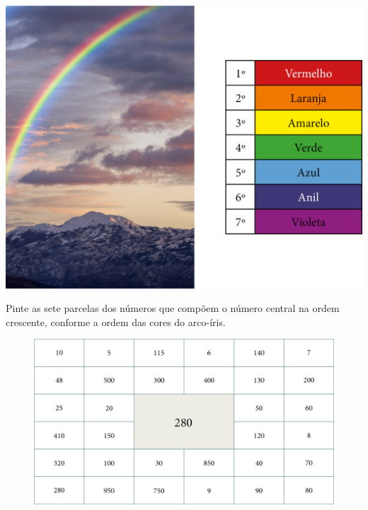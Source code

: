 \begin{minipage}{.7\textwidth}
\includegraphics[width=\textwidth]{./media/image21.png}
\end{minipage}
\begin{minipage}{.3\textwidth}
\end{minipage}\bigskip

Pinte as sete parcelas dos números que compõem o número central na ordem
crescente, conforme a ordem das cores do arco-íris.

\begin{figure}[htpb!]
\includegraphics[width=\textwidth]{./media/image22.png}
\end{figure}

